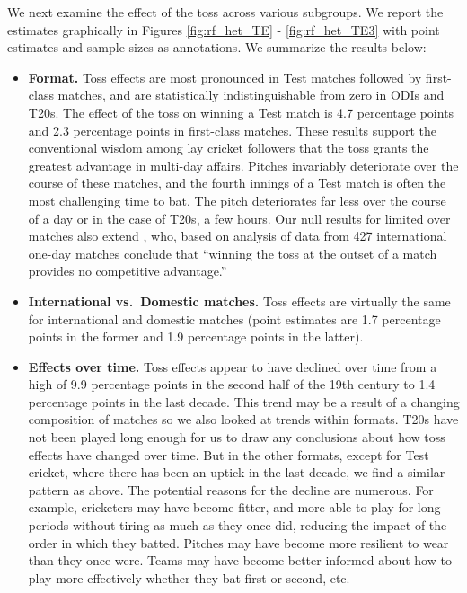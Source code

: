 \documentclass[12pt, letterpaper]{article}
\begin{document}
We next examine the effect of the toss across various subgroups. We report the estimates graphically in Figures \ref{fig:rf_het_TE} - \ref{fig:rf_het_TE3} with point estimates and sample sizes as annotations. We summarize the results below:
\begin{itemize}
\item \textbf{Format.} Toss effects are most pronounced in Test matches followed by first-class matches, and are statistically indistinguishable from zero in ODIs and T20s. The effect of the toss on winning a Test match is 4.7 percentage points and 2.3 percentage points in first-class matches. These results support the conventional wisdom among lay cricket followers that the toss grants the greatest advantage in multi-day affairs. Pitches invariably deteriorate over the course of these matches, and the fourth innings of a Test match is often the most challenging time to bat. The pitch deteriorates far less over the course of a day or in the case of T20s, a few hours. Our null results for limited over matches also extend \citet{de1998winning}, who, based on analysis of data from 427 international one-day matches conclude that ``winning the toss at the outset of a match provides no competitive advantage.''

\item \textbf{International vs.~Domestic matches.} Toss effects are virtually the same for international and domestic matches (point estimates are 1.7 percentage points in the former and 1.9 percentage points in the latter). 

\item \textbf{Effects over time.} Toss effects appear to have declined over time from a high of 9.9 percentage points in the second half of the 19th century to 1.4 percentage points in the last decade. This trend may be a result of a changing composition of matches so we also looked at trends within formats. T20s have not been played long enough for us to draw any conclusions about how toss effects have changed over time. But in the other formats, except for Test cricket, where there has been an uptick in the last decade, we find a similar pattern as above. The potential reasons for the decline are numerous. For example, cricketers may have become fitter, and more able to play for long periods without tiring as much as they once did, reducing the impact of the order in which they batted. Pitches may have become more resilient to wear than they once were. Teams may have become better informed about how to play more effectively whether they bat first or second, etc.


\end{itemize}
\end{document}
